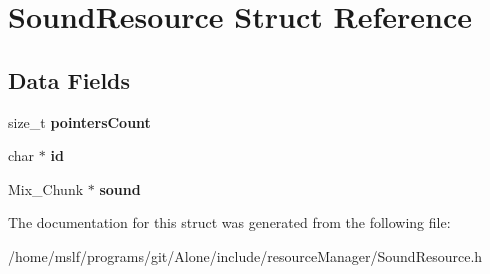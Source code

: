\hypertarget{struct_sound_resource}{}\section{Sound\+Resource Struct Reference}
\label{struct_sound_resource}
\subsection*{Data Fields}
\begin{DoxyCompactItemize}
\item 
\hypertarget{struct_sound_resource_aa058e87a17f5f5079be31c1631ed5f50}{}\label{struct_sound_resource_aa058e87a17f5f5079be31c1631ed5f50} 
size\+\_\+t {\bfseries pointers\+Count}
\item 
\hypertarget{struct_sound_resource_aecb3b0d045ada529257a2fbf8f829599}{}\label{struct_sound_resource_aecb3b0d045ada529257a2fbf8f829599} 
char $\ast$ {\bfseries id}
\item 
\hypertarget{struct_sound_resource_a0bb45d52afdd032f48e17a8519361d54}{}\label{struct_sound_resource_a0bb45d52afdd032f48e17a8519361d54} 
Mix\+\_\+\+Chunk $\ast$ {\bfseries sound}
\end{DoxyCompactItemize}


The documentation for this struct was generated from the following file\+:\begin{DoxyCompactItemize}
\item 
/home/mslf/programs/git/\+Alone/include/resource\+Manager/Sound\+Resource.\+h\end{DoxyCompactItemize}

